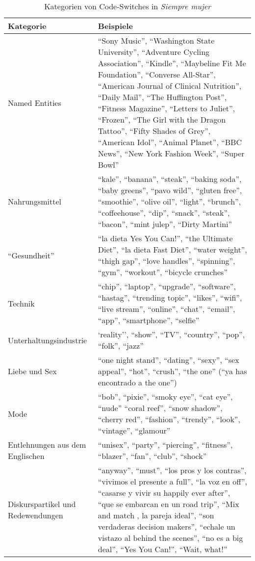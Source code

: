 \begin{table*}[h]
  \centering
    \begin{tabular}{l p{9cm} }
        Kategorie & Beispiele \\
    \hline
        Named Entities & ``Sony Music'', ``Washington State University'', ``Adventure Cycling Association'', ``Kindle'', ``Maybeline Fit Me Foundation'', ``Converse All-Star'',  ``American Journal of Clinical Nutrition'', ``Daily Mail'', ``The Huffington Post'', ``Fitness Magazine'', ``Letters to Juliet'', ``Frozen'', ``The Girl with the Dragon Tattoo'', ``Fifty Shades of Grey'', ``American Idol'', ``Animal Planet'', ``BBC News'', ``New York Fashion Week'', ``Super Bowl''\\
    \hline
        Nahrungsmittel & ``kale'', ``banana'', ``steak'', ``baking soda'', ``baby greens'', ``pavo wild'', ``gluten free'', ``smoothie'', ``olive oil'', ``light'', ``brunch'', ``coffeehouse'', ``dip'', ``snack'', ``steak'', ``bacon'', ``mint julep'', ``Dirty Martini''\\
    \hline
        ``Gesundheit'' & ``la dieta Yes You Can!'', ``the Ultimate Diet'', ``la dieta Fast Diet'', ``water weight'', ``thigh gap'', ``love handles'', ``spinning'', ``gym'', ``workout'', ``bicycle crunches''\\
    \hline
        Technik & ``chip'', ``laptop'', ``upgrade'', ``software'', ``hastag'', ``trending topic'', ``likes'', ``wifi'', ``live stream'', ``online'', ``chat'', ``email'', ``app'', ``smartphone'', ``selfie''\\
    \hline
        Unterhaltungsindustrie & `reality'', ``show'', ``TV'', ``country'', ``pop'', ``folk'', ``jazz''\\
    \hline
        Liebe und Sex & ``one night stand'', ``dating'', ``sexy'', ``sex appeal'', ``hot'', ``crush'', ``the one'' (``ya has encontrado a the one'')\\
    \hline
        Mode & ``bob'', ``pixie'', ``smoky eye'', ``cat eye'', ``nude'' ``coral reef'', ``snow shadow'', ``cherry red'', ``fashion'', ``trendy'', ``look'', ``vintage'', ``glamour''\\
    \hline
        Entlehnungen aus dem Englischen & ``unisex'', ``party'', ``piercing'', ``fitness'', ``blazer'', ``fan'', ``club'', ``shock'' \\
    \hline
        Diskurspartikel und Redewendungen & ``anyway'', ``must'', ``los pros y los contras'', ``vivimos el presente a full'', ``la voz en off'', ``casarse y vivir su happily ever after'', ``que se embarcan en un road trip'', ``Mix and match , la pareja ideal'', ``son verdaderas decision makers'', ``echale un vistazo al behind the scenes'', ``no es a big deal'', ``Yes You Can!'', ``Wait, what!''\\
  \end{tabular}
    \caption{Kategorien von Code-Switches in \emph{Siempre mujer}}~\label{tab:code-switch-cathegories}
\end{table*}

